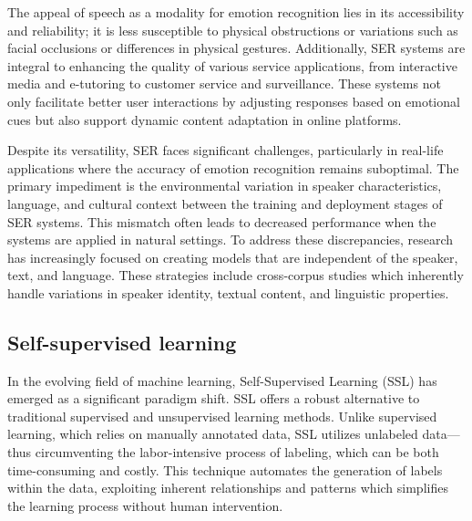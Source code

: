 \documentclass[a4paper,12pt]{article}
\begin{document}
The appeal of speech as a modality for emotion recognition lies in its accessibility and reliability; it is less susceptible to physical obstructions or variations such as facial occlusions or differences in physical gestures. Additionally, SER systems are integral to enhancing the quality of various service applications, from interactive media and e-tutoring to customer service and surveillance. These systems not only facilitate better user interactions by adjusting responses based on emotional cues but also support dynamic content adaptation in online platforms.

Despite its versatility, SER faces significant challenges, particularly in real-life applications where the accuracy of emotion recognition remains suboptimal. The primary impediment is the environmental variation in speaker characteristics, language, and cultural context between the training and deployment stages of SER systems. This mismatch often leads to decreased performance when the systems are applied in natural settings. To address these discrepancies, research has increasingly focused on creating models that are independent of the speaker, text, and language. These strategies include cross-corpus studies which inherently handle variations in speaker identity, textual content, and linguistic properties.

\subsection{Self-supervised learning}
In the evolving field of machine learning, Self-Supervised Learning (SSL) has emerged as a significant paradigm shift. SSL offers a robust alternative to traditional supervised and unsupervised learning methods. Unlike supervised learning, which relies on manually annotated data, SSL utilizes unlabeled data—thus circumventing the labor-intensive process of labeling, which can be both time-consuming and costly. This technique automates the generation of labels within the data, exploiting inherent relationships and patterns which simplifies the learning process without human intervention.
\end{document}

